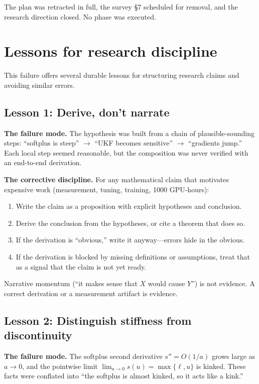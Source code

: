 The plan was retracted in full, the survey §7 scheduled for removal, and the research direction closed. No phase was executed.


\section{Lessons for research discipline}

This failure offers several durable lessons for structuring research claims and avoiding similar errors.

\subsection{Lesson 1: Derive, don't narrate}

\textbf{The failure mode.} The hypothesis was built from a chain of plausible-sounding steps: ``softplus is steep'' $\to$ ``UKF becomes sensitive'' $\to$ ``gradients jump.'' Each local step seemed reasonable, but the composition was never verified with an end-to-end derivation.

\textbf{The corrective discipline.} For any mathematical claim that motivates expensive work (measurement, tuning, training, 1000 GPU-hours):
\begin{enumerate}
\item Write the claim as a proposition with explicit hypotheses and conclusion.
\item Derive the conclusion from the hypotheses, or cite a theorem that does so.
\item If the derivation is ``obvious,'' write it anyway—errors hide in the obvious.
\item If the derivation is blocked by missing definitions or assumptions, treat that as a signal that the claim is not yet ready.
\end{enumerate}

Narrative momentum (``it makes sense that $X$ would cause $Y$'') is not evidence. A correct derivation or a measurement artifact is evidence.

\subsection{Lesson 2: Distinguish stiffness from discontinuity}

\textbf{The failure mode.} The softplus second derivative $s'' = O(1/a)$ grows large as $a \to 0$, and the pointwise limit $\lim_{a \to 0} s(u) = \max\{\ell, u\}$ is kinked. These facts were conflated into ``the softplus is almost kinked, so it acts like a kink.''


